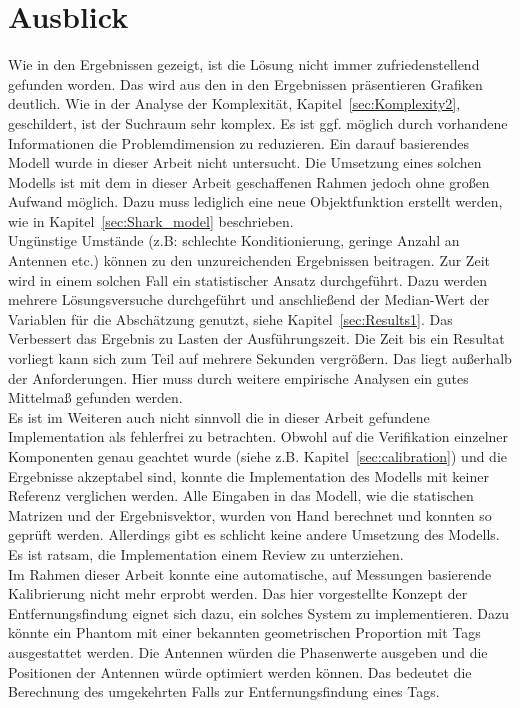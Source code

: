 %
\section{Ausblick}
\label{sec:Calibration_Optimaztion}
%
Wie in den Ergebnissen gezeigt, ist die Lösung nicht immer zufriedenstellend gefunden worden. Das wird aus den in den Ergebnissen präsentieren Grafiken deutlich. Wie in der Analyse der Komplexität, Kapitel~\ref{sec:Komplexity2}, geschildert, ist der Suchraum sehr komplex. Es ist ggf. möglich durch vorhandene Informationen die Problemdimension zu reduzieren. Ein darauf basierendes Modell wurde in dieser Arbeit nicht untersucht. Die Umsetzung eines solchen Modells ist mit dem in dieser Arbeit geschaffenen Rahmen jedoch ohne großen Aufwand möglich. Dazu muss lediglich eine neue Objektfunktion erstellt werden, wie in Kapitel~\ref{sec:Shark_model} beschrieben.\\

Ungünstige Umstände (z.B: schlechte Konditionierung, geringe Anzahl an Antennen etc.) können zu den unzureichenden Ergebnissen beitragen. Zur Zeit wird in einem solchen Fall ein statistischer Ansatz durchgeführt. Dazu werden mehrere Lösungsversuche durchgeführt und anschließend der Median-Wert der Variablen für die Abschätzung genutzt, siehe Kapitel~\ref{sec:Results1}. Das Verbessert das Ergebnis zu Lasten der Ausführungszeit. Die Zeit bis ein Resultat vorliegt kann sich zum Teil auf mehrere Sekunden vergrößern. Das liegt außerhalb der Anforderungen. Hier muss durch weitere empirische Analysen ein gutes Mittelmaß gefunden werden.\\
%

Es ist im Weiteren auch nicht sinnvoll die in dieser Arbeit gefundene Implementation als fehlerfrei zu betrachten. Obwohl auf die Verifikation einzelner Komponenten genau geachtet wurde (siehe z.B. Kapitel~\ref{sec:calibration}) und die Ergebnisse akzeptabel sind, konnte die Implementation des Modells mit keiner Referenz verglichen werden. Alle Eingaben in das Modell, wie die statischen Matrizen und der Ergebnisvektor, wurden von Hand berechnet und konnten so geprüft werden. Allerdings gibt es schlicht keine andere Umsetzung des Modells. Es ist ratsam, die Implementation einem Review zu unterziehen.\\
%

Im Rahmen dieser Arbeit konnte eine automatische, auf Messungen basierende Kalibrierung nicht mehr erprobt werden. Das hier vorgestellte Konzept der Entfernungsfindung eignet sich dazu, ein solches System zu implementieren. Dazu könnte ein Phantom mit einer bekannten geometrischen Proportion mit Tags ausgestattet werden. Die Antennen würden die Phasenwerte ausgeben und die Positionen der Antennen würde optimiert werden können. Das bedeutet die Berechnung des umgekehrten Falls zur Entfernungsfindung eines Tags.\\
%

